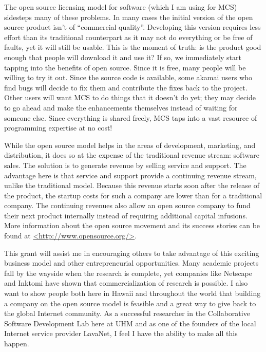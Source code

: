 The open source licensing model for software (which I am using for MCS)
sidesteps many of these problems. In many cases the initial version of the open
source product isn't of ``commercial quality''. Developing this version
requires less effort than its traditional counterpart as it may not do
everything or be free of faults, yet it will still be usable. This is the
moment of truth: is the product good enough that people will download it and
use it?  If so, we immediately start tapping into the benefits of open source.
Since it is free, many people will be willing to try it out. Since the source
code is available, some akamai users who find bugs will decide to fix them and
contribute the fixes back to the project.  Other users will want MCS to do
things that it doesn't do yet; they may decide to go ahead and make the
enhancements themselves instead of waiting for someone else. Since everything
is shared freely, MCS taps into a vast resource of programming expertise at no
cost!

While the open source model helps in the areas of development, marketing, and
distribution, it does so at the expense of the traditional revenue stream:
software sales. The solution is to generate revenue by selling service and
support. The advantage here is that service and support provide a continuing
revenue stream, unlike the traditional model. Because this revenue starts soon
after the release of the product, the startup costs for such a company are
lower than for a traditional company. The continuing revenues also allow an
open source company to fund their next product internally instead of requiring
additional capital infusions. More information about the open source movement
and its success stories can be found at \url{<http://www.opensource.org/>}.

This grant will assist me in encouraging others to take advantage of this
exciting business model and other entrepreneurial opportunities. Many academic
projects fall by the wayside when the research is complete, yet companies like
Netscape and Inktomi have shown that commercialization of research is possible.
I also want to show people both here in Hawaii and throughout the world that
building a company on the open source model is feasible and a great way to give
back to the global Internet community. As a successful researcher in the
Collaborative Software Development Lab here at UHM and as one of the founders
of the local Internet service provider LavaNet, I feel I have the ability to
make all this happen.
